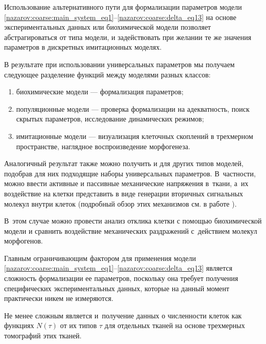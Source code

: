 \smallskip




 Использование альтернативного пути для формализации параметров модели \eqref{nazarov:coarse:main_system_eq1}--\eqref{nazarov:coarse:delta_eq13} на основе экспериментальных данных или биохимической модели позволяет абстрагироваться от типа модели, и задействовать при желании те же значения параметров в дискретных имитационных моделях. 

 В результате при использовании универсальных параметров мы получаем следующее разделение функций между моделями разных классов:

\begin{enumerate}

	\item биохимические модели --- формализация параметров;

	\item популяционные модели --- проверка формализации на адекватность, поиск скрытых параметров, исследование динамических режимов;

	\item имитационные модели --- визуализация клеточных скоплений в трехмерном пространстве, наглядное воспроизведение морфогенеза.

\end{enumerate}



Аналогичный результат также можно получить и для других типов моделей, подобрав для них подходящие наборы универсальных параметров. В~частности, можно ввести активные и пассивные механические напряжения в~ткани, а~их воздействие на клетки представить в виде генерации вторичных сигнальных молекул внутри клеток (подробный обзор этих механизмов см. в работе \cite{Edmondson:bib:Edmondson2016}). 

В~этом случае можно  провести анализ отклика клетки с помощью биохимической модели и сравнить воздействие механических раздражений с~действием  молекул морфогенов.

 

 Главным ограничивающим фактором для применения модели \eqref{nazarov:coarse:main_system_eq1}--\eqref{nazarov:coarse:delta_eq13} является сложность формализации ее параметров, поскольку она требует получения специфических экспериментальных данных, которые на данный момент практически никем не измеряются. 

 Не менее сложным является и~получение данных о численности клеток как функциях $N(\tau)$ от их типов $\tau$ для отдельных тканей на основе трехмерных томографий этих тканей. 

